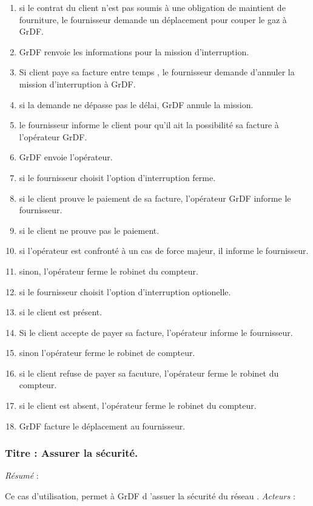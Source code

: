 \documentclass[
12pt,
french,                           %
a4paper,
]{article}
\begin{document}
\begin{enumerate}[1.]
\item
  si le contrat du client n'est pas soumis à une obligation de maintient
  de fourniture, le fournisseur demande un déplacement pour couper le
  gaz à GrDF.
\item
  GrDF renvoie les informations pour la mission d'interruption.
\item
  Si client paye sa facture entre temps , le fournisseur demande
  d'annuler la mission d'interruption à GrDF.
\item
  si la demande ne dépasse pas le délai, GrDF annule la mission.
\item
  le fournisseur informe le client pour qu'il ait la possibilité sa
  facture à l'opérateur GrDF.
\item
  GrDF envoie l'opérateur.
\item
  si le fournisseur choisit l'option d'interruption ferme.
\item
  si le client prouve le paiement de sa facture, l'opérateur GrDF
  informe le fournisseur.
\item
  si le client ne prouve pas le paiement.
\item
  si l'opérateur est confronté à un cas de force majeur, il informe le
  fournisseur.
\item
  sinon, l'opérateur ferme le robinet du compteur.
\item
  si le fournisseur choisit l'option d'interruption optionelle.
\item
  si le client est présent.
\item
  Si le client accepte de payer sa facture, l'opérateur informe le
  fournisseur.
\item
  sinon l'opérateur ferme le robinet de compteur.
\item
  si le client refuse de payer sa facuture, l'opérateur ferme le robinet
  du compteur.
\item
  si le client est absent, l'opérateur ferme le robinet du compteur.
\item
  GrDF facture le déplacement au fournisseur.
\end{enumerate}

\subsubsection{Titre : Assurer la sécurité.}

\emph{Résumé} :

Ce cas d'utilisation, permet à GrDF d 'assuer la sécurité du réseau .
\emph{Acteurs} :
\end{document}
